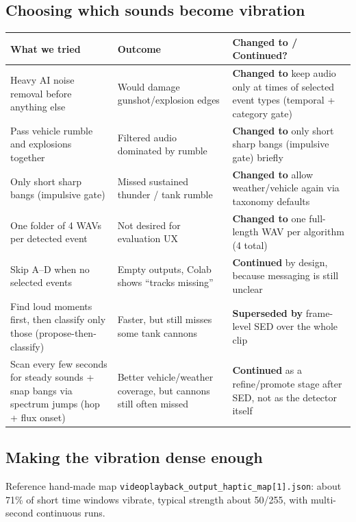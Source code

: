 \documentclass[11pt,a4paper]{article}
\begin{document}
\subsection*{Choosing which sounds become vibration}
\begin{center}
\small
\begin{tabularx}{\textwidth}{@{}>{\raggedright\arraybackslash}p{4cm}>{\raggedright\arraybackslash}p{4cm}>{\raggedright\arraybackslash}X@{}}
\toprule
\textbf{What we tried} & \textbf{Outcome} & \textbf{Changed to / Continued?} \\
\midrule
Heavy AI noise removal before anything else & Would damage gunshot/explosion edges & \textbf{Changed to} keep audio only at times of selected event types (temporal + category gate) \\
\addlinespace
Pass vehicle rumble and explosions together & Filtered audio dominated by rumble & \textbf{Changed to} only short sharp bangs (impulsive gate) briefly \\
\addlinespace
Only short sharp bangs (impulsive gate) & Missed sustained thunder / tank rumble & \textbf{Changed to} allow weather/vehicle again via taxonomy defaults \\
\addlinespace
One folder of 4 WAVs per detected event & Not desired for evaluation UX & \textbf{Changed to} one full-length WAV per algorithm (4 total) \\
\addlinespace
Skip A--D when no selected events & Empty outputs, Colab shows ``tracks missing'' & \textbf{Continued} by design, because messaging is still unclear \\
\addlinespace
Find loud moments first, then classify only those (propose-then-classify) & Faster, but still misses some tank cannons & \textbf{Superseded by} frame-level SED over the whole clip \\
\addlinespace
Scan every few seconds for steady sounds + snap bangs via spectrum jumps (hop + flux onset) & Better vehicle/weather coverage, but cannons still often missed & \textbf{Continued} as a refine/promote stage after SED, not as the detector itself \\
\bottomrule
\end{tabularx}
\end{center}

\newpage
\subsection*{Making the vibration dense enough}
Reference hand-made map \texttt{videoplayback\_output\_haptic\_map[1].json}: about 71\% of short time windows vibrate, typical strength about 50/255, with multi-second continuous runs.
\end{document}
